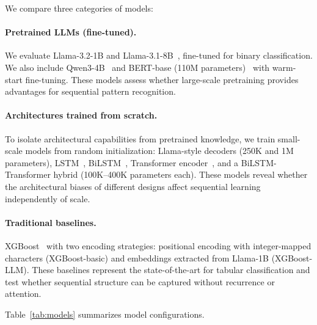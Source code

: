 We compare three categories of models:

\paragraph{Pretrained LLMs (fine-tuned).} 
We evaluate Llama-3.2-1B and Llama-3.1-8B~\citep{touvron2023llama, grattafiori2024llama3}, fine-tuned for binary classification. We also include Qwen3-4B~\citep{bai2023qwen} and BERT-base (110M parameters)~\citep{devlin2019bert} with warm-start fine-tuning. These models assess whether large-scale pretraining provides advantages for sequential pattern recognition.

\paragraph{Architectures trained from scratch.}
To isolate architectural capabilities from pretrained knowledge, we train small-scale models from random initialization: Llama-style decoders (250K and 1M parameters), LSTM~\citep{hochreiter1997lstm}, BiLSTM~\citep{graves2005bilstm}, Transformer encoder~\citep{vaswani2017attention}, and a BiLSTM-Transformer hybrid (100K--400K parameters each). These models reveal whether the architectural biases of different designs affect sequential learning independently of scale.

\paragraph{Traditional baselines.}
XGBoost~\citep{chen2016xgboost} with two encoding strategies: positional encoding with integer-mapped characters (XGBoost-basic) and embeddings extracted from Llama-1B (XGBoost-LLM). These baselines represent the state-of-the-art for tabular classification and test whether sequential structure can be captured without recurrence or attention.

Table~\ref{tab:models} summarizes model configurations.

